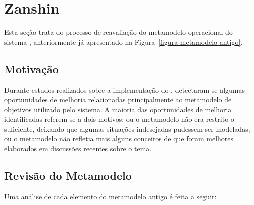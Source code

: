 
\chapter{Zanshin}
\label{sec-zanshin}

Esta seção trata do processo de reavaliação do metamodelo operacional do sistema \zanshin, anteriormente já apresentado na Figura~\ref{figura-metamodelo-antigo}.

\section{Motivação}
\label{sec-zanshin-motivacao}
Durante estudos realizados sobre a implementação do \framework \zanshin, detectaram-se algumas oportunidades de melhoria relacionadas principalmente ao metamodelo de objetivos utilizado pelo sistema. A maioria das oportunidades de melhoria identificadas referem-se a dois motivos: ou o metamodelo não era restrito o suficiente, deixando que algumas situações indesejadas pudessem ser modeladas; ou o metamodelo não refletia mais alguns conceitos de \gore que foram melhores elaborados em discussões recentes sobre o tema. 


\section{Revisão do Metamodelo}
\label{sec-zanshin-revisao}
Uma análise de cada elemento do metamodelo antigo é feita a seguir:

